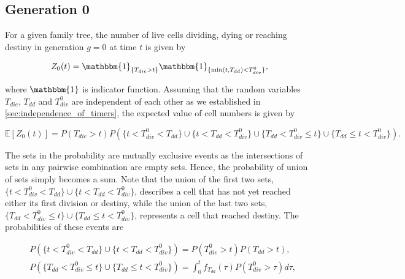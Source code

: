 \documentclass[11pt, a4paper]{article}
\begin{document}
\nolinenumbers
\subsection{Generation 0}
For a given family tree, the number of live cells dividing, dying or reaching destiny in generation $g=0$ at time $t$ is given by
\begin{linenomath*}
    \begin{equation*}
        Z_0(t) = \mathbbm{1}_{\{T_{die} > t\}} \mathbbm{1}_{\{\min(t, T_{dd}) < T_{div}^0\}},
    \end{equation*}
\end{linenomath*}
where $\mathbbm{1}$ is indicator function. Assuming that the random variables $T_{die}$, $T_{dd}$ and $T_{div}^0$ are independent of each other as we established in \cref{sec:independence_of_timers}, the expected value of cell numbers is given by
\begin{linenomath*} 
    \begin{equation}
        \label{eq:primitive_gen0}
        \mathbb{E}[Z_0(t)] = P(T_{die} > t) P(\{t < T_{div}^0 < T_{dd}\} \cup \{t < T_{dd} < T_{div}^0\} \cup \{T_{dd} < T_{div}^0 \leq t\} \cup \{T_{dd} \leq t < T_{div}^0\}).
    \end{equation}
\end{linenomath*}
The sets in the probability are mutually exclusive events as the intersections of sets in any pairwise combination are empty sets. Hence, the probability of union of sets simply becomes a sum. Note that the union of the first two sets, $\{t < T_{div}^0 < T_{dd}\} \cup \{t < T_{dd} < T_{div}^0\}$, describes a cell that has not yet reached either its first division or destiny, while the union of the last two sets, $\{T_{dd} < T_{div}^0 \leq t\} \cup \{T_{dd} \leq t < T_{div}^0\}$, represents a cell that reached destiny. The probabilities of these events are
\begin{linenomath*}
    \begin{equation}
    \label{eq:prob_gen0}
    \begin{aligned}
        & P(\{t < T_{div}^0 < T_{dd}\} \cup \{t < T_{dd} < T_{div}^0\}) = P(T_{div}^0 > t)P(T_{dd} > t), \\
        & P(\{T_{dd} < T_{div}^0 \leq t\} \cup \{T_{dd} \leq t < T_{div}^0\}) = \int_0^t f_{T_{dd}}(\tau)P(T_{div}^0 > \tau) d\tau,
    \end{aligned}
    \end{equation}
\end{linenomath*}
\end{document}
